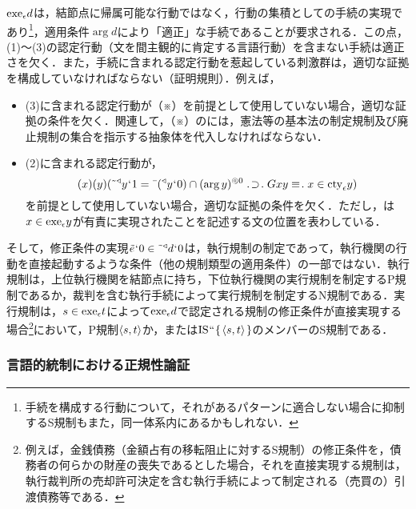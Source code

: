 $ \mathrm{exe}_{\epsilon}{d} $は，結節点に帰属可能な行動ではなく，行動の集積としての手続の実現であり\footnote{
    手続を構成する行動について，それがあるパターンに適合しない場合に抑制するS規制もまた，同一体系内にあるかもしれない．
}，適用条件$ \arg d $により「適正」な手続であることが要求される．この点，(1)〜(3)の認定行動（文を間主観的に肯定する言語行動）を含まない手続は適正さを欠く．また，手続に含まれる認定行動を惹起している刺激群は，適切な証拠を構成していなければならない（証明規則）．例えば，
\begin{itemize}
    \item (3)に含まれる認定行動が（※）を前提として使用していない場合，適切な証拠の条件を欠く．関連して，（※）の\kagi{$ \alpha $}には，憲法等の基本法の制定規制及び廃止規制の集合を指示する抽象体を代入しなければならない．
    \item (2)に含まれる認定行動が，
    \[
        (x)(y)(\tildel{\trgl{y}}\fap 1 = \barl{(\trgl{y}\fap 0)}\cap\msec{(\arg y)}{0}\case{1}{1}{1}Gxy\case{3}{0}{1}x\in \cty{\epsilon}y)
    \]
    を前提として使用していない場合，適切な証拠の条件を欠く．ただし，は$ x\in\mathrm{exe}_{\epsilon} y $が有責に実現されたことを記述する文の位置を表わしている．
\end{itemize}
そして，修正条件の実現$ \tilde{e}{\mspace{1mu}{`}\mspace{1mu}} 0\in \tilde{\:\:}{^\triangleleft}d{\mspace{1mu}{`}\mspace{1mu}} 0 $は，執行規制の制定であって，執行機関の行動を直接起動するような条件（他の規制類型の適用条件）の一部ではない．執行規制は，上位執行機関を結節点に持ち，下位執行機関の実行規制を制定するP規制であるか，裁判を含む執行手続によって実行規制を制定するN規制である．実行規制は，$ s\in\mathrm{exe}_{\epsilon} t $によって$ \mathrm{exe}_{\epsilon} d $で認定される規制の修正条件が直接実現する場合\footnote{
    例えば，金銭債務（金額占有の移転阻止に対するS規制）の修正条件を，債務者の何らかの財産の喪失であるとした場合，それを直接実現する規制は，執行裁判所の売却許可決定を含む執行手続によって制定される（売買の）引渡債務等である．
}において，P規制$\langle s,t \rangle$か，または$ \mathrm{IS}{\mspace{1mu}{``}\mspace{1mu}}\{\mspace{2mu}\langle s,t \rangle\mspace{2mu}\} $のメンバーのS規制である．

\subsubsection{言語的統制における正規性論証}
\label{sssec:言語的統制における正規性論証}

